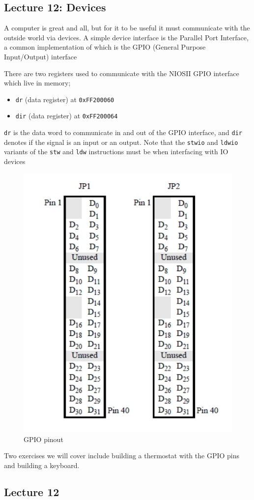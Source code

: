 \documentclass[../notes.tex]{subfiles}
\begin{document}
\subsection{Lecture 12: Devices}


A computer is great and all, but for it to be useful it must communicate with the outside world via devices. A simple device interface is the Parallel Port Interface, a common implementation of which is the GPIO (General Purpose Input/Output) interface

There are two registers used to communicate with the NIOSII GPIO interface which live in memory;

\begin{itemize}
	\item \texttt{dr}  (data register) at \texttt{0xFF200060} 
	\item \texttt{dir}  (data register) at \texttt{0xFF200064} 
\end{itemize}

\texttt{dr} is the data word to communicate in and out of the GPIO interface, and \texttt{dir} denotes if the signal is an input or an output. Note that the \texttt{stwio} and \texttt{ldwio} variants of the \texttt{stw} and \texttt{ldw} instructions must be when interfacing with IO devices



\begin{figure}[H]
	\centering
	\includegraphics[width=0.8\linewidth]{img/image_2022-10-06-13-47-12.png}
	\caption{GPIO pinout}
\end{figure}


Two exercises we will cover include building a thermostat with the GPIO pins and building a keyboard. 









\subsection{Lecture 12}
\end{document}
